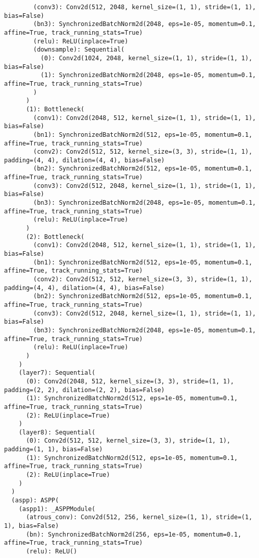 \begin{verbatim}
        (conv3): Conv2d(512, 2048, kernel_size=(1, 1), stride=(1, 1), bias=False)
        (bn3): SynchronizedBatchNorm2d(2048, eps=1e-05, momentum=0.1, affine=True, track_running_stats=True)
        (relu): ReLU(inplace=True)
        (downsample): Sequential(
          (0): Conv2d(1024, 2048, kernel_size=(1, 1), stride=(1, 1), bias=False)
          (1): SynchronizedBatchNorm2d(2048, eps=1e-05, momentum=0.1, affine=True, track_running_stats=True)
        )
      )
      (1): Bottleneck(
        (conv1): Conv2d(2048, 512, kernel_size=(1, 1), stride=(1, 1), bias=False)
        (bn1): SynchronizedBatchNorm2d(512, eps=1e-05, momentum=0.1, affine=True, track_running_stats=True)
        (conv2): Conv2d(512, 512, kernel_size=(3, 3), stride=(1, 1), padding=(4, 4), dilation=(4, 4), bias=False)
        (bn2): SynchronizedBatchNorm2d(512, eps=1e-05, momentum=0.1, affine=True, track_running_stats=True)
        (conv3): Conv2d(512, 2048, kernel_size=(1, 1), stride=(1, 1), bias=False)
        (bn3): SynchronizedBatchNorm2d(2048, eps=1e-05, momentum=0.1, affine=True, track_running_stats=True)
        (relu): ReLU(inplace=True)
      )
      (2): Bottleneck(
        (conv1): Conv2d(2048, 512, kernel_size=(1, 1), stride=(1, 1), bias=False)
        (bn1): SynchronizedBatchNorm2d(512, eps=1e-05, momentum=0.1, affine=True, track_running_stats=True)
        (conv2): Conv2d(512, 512, kernel_size=(3, 3), stride=(1, 1), padding=(4, 4), dilation=(4, 4), bias=False)
        (bn2): SynchronizedBatchNorm2d(512, eps=1e-05, momentum=0.1, affine=True, track_running_stats=True)
        (conv3): Conv2d(512, 2048, kernel_size=(1, 1), stride=(1, 1), bias=False)
        (bn3): SynchronizedBatchNorm2d(2048, eps=1e-05, momentum=0.1, affine=True, track_running_stats=True)
        (relu): ReLU(inplace=True)
      )
    )
    (layer7): Sequential(
      (0): Conv2d(2048, 512, kernel_size=(3, 3), stride=(1, 1), padding=(2, 2), dilation=(2, 2), bias=False)
      (1): SynchronizedBatchNorm2d(512, eps=1e-05, momentum=0.1, affine=True, track_running_stats=True)
      (2): ReLU(inplace=True)
    )
    (layer8): Sequential(
      (0): Conv2d(512, 512, kernel_size=(3, 3), stride=(1, 1), padding=(1, 1), bias=False)
      (1): SynchronizedBatchNorm2d(512, eps=1e-05, momentum=0.1, affine=True, track_running_stats=True)
      (2): ReLU(inplace=True)
    )
  )
  (aspp): ASPP(
    (aspp1): _ASPPModule(
      (atrous_conv): Conv2d(512, 256, kernel_size=(1, 1), stride=(1, 1), bias=False)
      (bn): SynchronizedBatchNorm2d(256, eps=1e-05, momentum=0.1, affine=True, track_running_stats=True)
      (relu): ReLU()

\end{verbatim}
